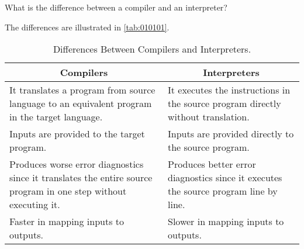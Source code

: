 \begin{exercise}\label{ex:010101}
    What is the difference between a compiler and an interpreter?
\end{exercise}
\begin{solution}\label{sol:010101}
    The differences are illustrated in \autoref{tab:010101}.
    \begin{table}[!ht]
        \centering
        \begin{tabularx}{\columnwidth}{|X|X|}
            \hline
            \multicolumn{1}{|c|}{\textbf{Compilers}} & \multicolumn{1}{c|}{\textbf{Interpreters}} \\
            \hline
            It translates a program from source language to an equivalent program 
            in the target language.
            &
            It executes the instructions in the source program directly without 
            translation. \\
            \hline
            Inputs are provided to the target program. 
            & 
            Inputs are provided directly to the source program. \\
            \hline
            Produces worse error diagnostics since it translates the entire source 
            program in one step without executing it.
            &
            Produces better error diagnostics since it executes the source program
            line by line. \\
            \hline
            Faster in mapping inputs to outputs.
            &
            Slower in mapping inputs to outputs. \\
            \hline        
        \end{tabularx}
        \caption{Differences Between Compilers and Interpreters.}
        \label{tab:010101}
    \end{table} 
\end{solution}